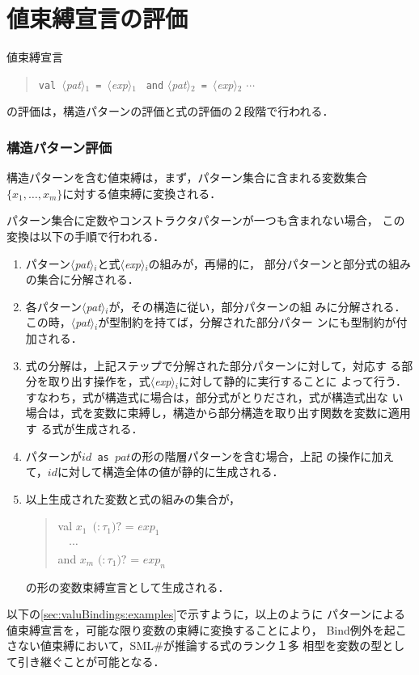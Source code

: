 \documentclass{jbook}
\newif\ifjp
\newcommand{\txt}[2]{#1}
\newcommand{\smlsharp}{SML\#}
\newcommand{\nonterm}[1]{\mbox{$\langle$}{\it #1}\mbox{$\rangle$}}
\newcommand{\term}[1]{\mbox{{\tt #1}}}
\newcommand{\optional}[1]{\mbox{$($}{\protect #1}\mbox{$)?$}}
\newcommand{\myem}{\mbox{\ \ }}
\newenvironment{program}{\begin{quote}\begin{tt}}%
                        {\end{tt}\end{quote}}
\begin{document}
\section{\txt{値束縛宣言の評価}{}}
\ifjp%

	値束縛宣言

\begin{program}
\term{val}\ \nonterm{pat}$_1$\ \term{=}\ \nonterm{exp}$_1$ \ \term{and} \nonterm{pat}$_2$\ \term{=}\ \nonterm{exp}$_2$ $\cdots$
\end{program}

の評価は，構造パターンの評価と式の評価の２段階で行われる．

\subsubsection{構造パターン評価}

	構造パターンを含む値束縛は，まず，パターン集合に含まれる変数集合
$\{x_1,\ldots,x_m\}$に対する値束縛に変換される．
	
	パターン集合に定数やコンストラクタパターンが一つも含まれない場合，
この変換は以下の手順で行われる．
\begin{enumerate}
\item 
	パターン\nonterm{pat}$_i$と式\nonterm{exp}$_i$の組みが，再帰的に，
部分パターンと部分式の組みの集合に分解される．

\item 
	各パターン\nonterm{pat}$_i$が，その構造に従い，部分パターンの組
みに分解される．
	この時，\nonterm{pat}$_i$が型制約を持てば，分解された部分パター
ンにも型制約が付加される．

\item 
	式の分解は，上記ステップで分解された部分パターンに対して，対応す
る部分を取り出す操作を，式\nonterm{exp}$_i$に対して静的に実行することに
よって行う．
	すなわち，式が構造式に場合は，部分式がとりだされ，式が構造式出な
い場合は，式を変数に束縛し，構造から部分構造を取り出す関数を変数に適用す
る式が生成される．

\item 
	パターンが{\tt $id$ as $pat$}の形の階層パターンを含む場合，上記
の操作に加えて，$id$に対して構造全体の値が静的に生成される．

\item 以上生成された変数と式の組みの集合が，
\begin{program}
  val $x_1$\ \optional{$:\tau_1$} = $exp_1$\\
  \myem $\cdots$\\
  and $x_m$ \optional{$:\tau_1$} = $exp_n$
\end{program}
の形の変数束縛宣言として生成される．
\end{enumerate}
	以下の\ref{sec:valuBindings:examples}で示すように，以上のように
パターンによる値束縛宣言を，可能な限り変数の束縛に変換することにより，
Bind例外を起こさない値束縛において，\smlsharp{}が推論する式のランク１多
相型を変数の型として引き継ぐことが可能となる．
\end{document}
